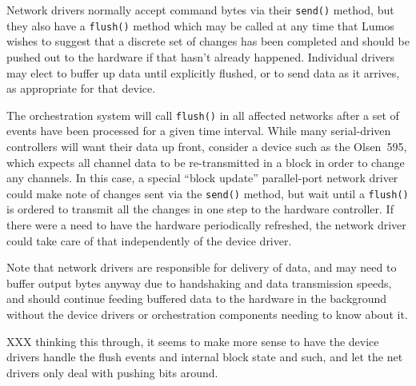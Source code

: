 \documentclass{article}
\begin{document}
Network drivers normally accept command bytes via their {\tt send()} method,
but they also have a {\tt flush()} method which may be called at any time
that Lumos wishes to suggest that a discrete set of changes has been completed
and should be pushed out to the hardware if that hasn't already happened.
Individual drivers may elect to buffer up data until explicitly flushed, or
to send data as it arrives, as appropriate for that device.

The orchestration system will call {\tt flush()} in all affected networks
after a set of events have been processed for a given time interval.  
While many serial-driven controllers will want their data up front, consider
a device such as the Olsen~595, which expects all channel data to be 
re-transmitted in a block in order to change any channels.  In this case,
a special ``block update'' parallel-port network driver could make note of
changes sent via the {\tt send()} method, but wait until a {\tt flush()} 
is ordered to transmit all the changes in one step to the hardware
controller.  If there were a need to have the hardware periodically 
refreshed, the network driver could take care of that independently of the
device driver.

Note that network drivers are responsible for delivery of data, and may 
need to buffer output bytes anyway due to handshaking and data transmission
speeds, and should continue feeding buffered data to the hardware in the
background without the device drivers or orchestration components needing
to know about it.

XXX thinking this through, it seems to make more sense to have the device
drivers handle the flush events and internal block state and such, and 
let the net drivers only deal with pushing bits around.
\end{document}
